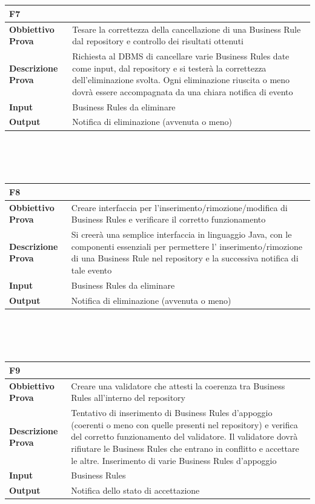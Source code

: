 \documentclass[11pt,titlepage,a4paper]{report}
\begin{document}
\\
\\
\begin{tabular}{||p{4.5cm}||p{7.5cm}||}
\hline
\textbf{\textsf{F7}}& \\
\hline
{\textbf {Obbiettivo Prova}}& Tesare la correttezza della cancellazione di una Business Rule dal repository e controllo dei risultati ottenuti\\ \hline
{\textbf{Descrizione Prova}}&  Richiesta al DBMS di cancellare varie Business Rules date come input, dal repository e si tester\`a la correttezza dell'eliminazione svolta. Ogni eliminazione riuscita o meno dovr\`a essere accompagnata da una chiara notifica di evento\\ \hline
{\textbf{Input}}& Business Rules da eliminare \\ \hline
{\textbf{Output}}& Notifica di eliminazione (avvenuta o meno) \\ \hline
\end{tabular} \\
\\
\\
\begin{tabular}{||p{4.5cm}||p{7.5cm}||}
\hline
\textbf{\textsf{F8}}& \\
\hline
{\textbf {Obbiettivo Prova}}& Creare interfaccia per l'inserimento/rimozione/modifica di Business Rules e verificare il corretto funzionamento\\ \hline
{\textbf{Descrizione Prova}}& Si creer\`a  una semplice interfaccia in linguaggio Java, con le componenti essenziali per permettere l' inserimento/rimozione di una Business Rule nel repository e la successiva notifica di tale evento \\ \hline
{\textbf{Input}}& Business Rules da eliminare \\ \hline
{\textbf{Output}}& Notifica di eliminazione (avvenuta o meno) \\ \hline
\end{tabular} \\
\\
\\
\begin{tabular}{||p{4.5cm}||p{7.5cm}||}
\hline
\textbf{\textsf{F9}}& \\
\hline
{\textbf {Obbiettivo Prova}}& Creare una validatore che attesti la coerenza tra Business Rules all'interno del repository \\ \hline
{\textbf{Descrizione Prova}}& Tentativo di inserimento di Business Rules d'appoggio (coerenti o meno con quelle presenti nel repository) e verifica del corretto funzionamento del validatore. Il validatore dovr\`a rifiutare le Business Rules che entrano in conflitto e accettare le altre. Inserimento di varie Business Rules d'appoggio  \\ \hline
{\textbf{Input}}& Business Rules \\ \hline
{\textbf{Output}}& Notifica dello stato di accettazione \\ \hline
\end{tabular} \\
\end{document}
